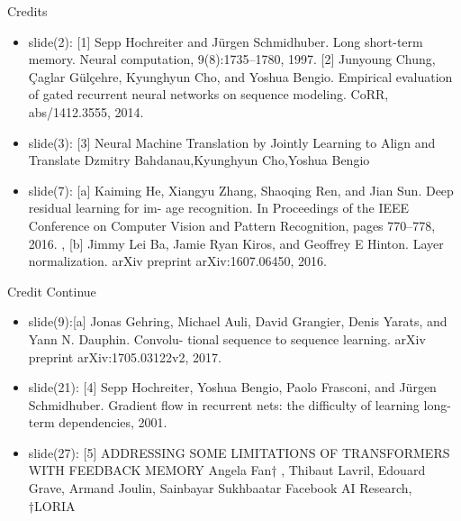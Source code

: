 \documentclass{beamer}
\begin{document}
\begin{frame}{Credits}

\begin{itemize}



\item slide(2): [1] Sepp Hochreiter and Jürgen Schmidhuber. Long short-term memory. Neural computation, 9(8):1735–1780, 1997. [2] Junyoung Chung, Çaglar Gülçehre, Kyunghyun Cho, and Yoshua Bengio. Empirical evaluation of gated recurrent neural networks on sequence modeling. CoRR, abs/1412.3555, 2014. 

\item slide(3): [3] Neural Machine Translation by Jointly Learning to Align and Translate Dzmitry Bahdanau,Kyunghyun Cho,Yoshua Bengio

\item slide(7): [a] Kaiming He, Xiangyu Zhang, Shaoqing Ren, and Jian Sun. Deep residual learning for im- age recognition. In Proceedings of the IEEE Conference on Computer Vision and Pattern Recognition, pages 770–778, 2016. , [b] Jimmy Lei Ba, Jamie Ryan Kiros, and Geoffrey E Hinton. Layer normalization. arXiv preprint arXiv:1607.06450, 2016.  

\end{itemize}
\end{frame}

\begin{frame}{Credit Continue}

\begin{itemize}
\item slide(9):[a] Jonas Gehring, Michael Auli, David Grangier, Denis Yarats, and Yann N. Dauphin. Convolu- tional sequence to sequence learning. arXiv preprint arXiv:1705.03122v2, 2017. 

\item slide(21): [4] Sepp Hochreiter, Yoshua Bengio, Paolo Frasconi, and Jürgen Schmidhuber. Gradient flow in recurrent nets: the difficulty of learning long-term dependencies, 2001.

\item slide(27): [5] ADDRESSING SOME LIMITATIONS OF TRANSFORMERS WITH FEEDBACK MEMORY Angela Fan† , Thibaut Lavril, Edouard Grave, Armand Joulin, Sainbayar Sukhbaatar Facebook AI Research, †LORIA
\end{itemize}
\end{frame}
\end{document}
